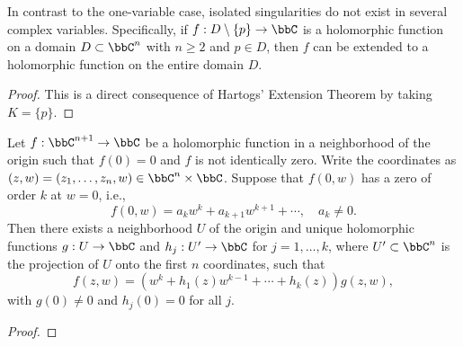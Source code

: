 
    \begin{corollary}\label{cor:nonexistence_of_isolated_singularities_in_several_complex_variables}
        In contrast to the one-variable case, isolated singularities do not exist in several complex variables. 
        Specifically, if \(f: D \setminus \{p\} \to \bbC\) is a holomorphic function on a domain \(D \subset \bbC^n\) with \(n \geq 2\) and \(p \in D\), then \(f\) can be extended to a holomorphic function on the entire domain \(D\).
    \end{corollary}
    \begin{proof}
        This is a direct consequence of Hartogs' Extension Theorem by taking \(K = \{p\}\).
    \end{proof}

    \begin{theorem}\label{thm:Weierstrass_Preparation_Theorem}
        Let \(f: \bbC^{n+1} \to \bbC\) be a holomorphic function in a neighborhood of the origin such that \(f(0) = 0\) and \(f\) is not identically zero. 
        Write the coordinates as \((z,w) = (z_1, \ldots, z_n, w) \in \bbC^{n} \times \bbC\).
        Suppose that \(f(0,w)\) has a zero of order \(k\) at \(w = 0\), i.e.,
        \[ f(0,w) = a_k w^k + a_{k+1} w^{k+1} + \cdots, \quad a_k \neq 0. \]
        Then there exists a neighborhood \(U\) of the origin and unique holomorphic functions \(g: U \to \bbC\) and \(h_j: U' \to \bbC\) for \(j = 1, \ldots, k\), where \(U' \subset \bbC^n\) is the projection of \(U\) onto the first \(n\) coordinates, such that
        \[ f(z,w) = (w^k + h_1(z) w^{k-1} + \cdots + h_k(z)) g(z,w), \]
        with \(g(0) \neq 0\) and \(h_j(0) = 0\) for all \(j\).
    \end{theorem}
    \begin{proof}
    \end{proof}

